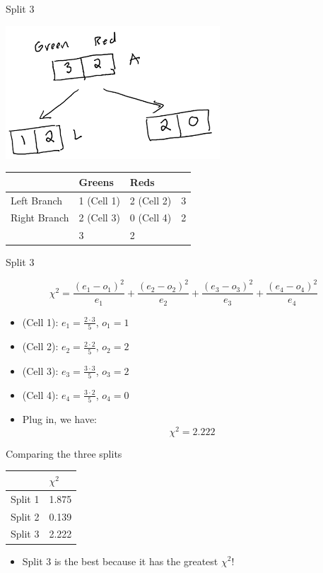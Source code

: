 \documentclass[
  ignorenonframetext,
]{beamer}
\providecommand{\tightlist}{%
  \setlength{\itemsep}{0pt}\setlength{\parskip}{0pt}}
\begin{document}
\begin{frame}{Split 3}
\protect\hypertarget{split-3}{}

\includegraphics{images2/im2.png}

\begin{longtable}[]{@{}llll@{}}
\toprule
& Greens & Reds &\tabularnewline
\midrule
\endhead
Left Branch & 1 (Cell 1) & 2 (Cell 2) & 3\tabularnewline
Right Branch & 2 (Cell 3) & 0 (Cell 4) & 2\tabularnewline
& 3 & 2 &\tabularnewline
\bottomrule
\end{longtable}

\end{frame}

\begin{frame}{Split 3}
\protect\hypertarget{split-3-1}{}

\[\chi^2 = \frac{(e_1-o_1)^2}{e_1}+\frac{(e_2-o_2)^2}{e_2}+\frac{(e_3-o_3)^2}{e_3}+\frac{(e_4-o_4)^2}{e_4}\]

\begin{itemize}
\item
  (Cell 1): \(e_1 = \frac{2\cdot 3}{5}\), \(o_1 = 1\)
\item
  (Cell 2): \(e_2 = \frac{2\cdot 2}{5}\), \(o_2 = 2\)
\item
  (Cell 3): \(e_3 = \frac{3\cdot 3}{5}\), \(o_3 = 2\)
\item
  (Cell 4): \(e_4 = \frac{3\cdot 2}{5}\), \(o_4 = 0\)
\item
  Plug in, we have: \[\chi^2 = 2.222\]
\end{itemize}

\end{frame}

\begin{frame}{Comparing the three splits}
\protect\hypertarget{comparing-the-three-splits}{}

\begin{longtable}[]{@{}ll@{}}
\toprule
& \(\chi^2\)\tabularnewline
\midrule
\endhead
Split 1 & 1.875\tabularnewline
Split 2 & 0.139\tabularnewline
Split 3 & 2.222\tabularnewline
\bottomrule
\end{longtable}

\begin{itemize}
\tightlist
\item
  Split 3 is the best because it has the greatest \(\chi^2\)!
\end{itemize}

\end{frame}
\end{document}
